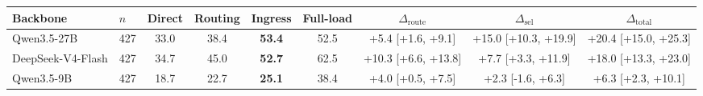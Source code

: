\begin{tabular}{llcccc ccc}
\toprule
Backbone & $n$ & Direct & Routing & Ingress & Full-load & $\Delta_{\text{route}}$ & $\Delta_{\text{sel}}$ & $\Delta_{\text{total}}$ \\
\midrule
Qwen3.5-27B & 427 & 33.0 & 38.4 & \textbf{53.4} & 52.5 & +5.4 [+1.6, +9.1] & +15.0 [+10.3, +19.9] & +20.4 [+15.0, +25.3] \\
DeepSeek-V4-Flash & 427 & 34.7 & 45.0 & \textbf{52.7} & 62.5 & +10.3 [+6.6, +13.8] & +7.7 [+3.3, +11.9] & +18.0 [+13.3, +23.0] \\
Qwen3.5-9B & 427 & 18.7 & 22.7 & \textbf{25.1} & 38.4 & +4.0 [+0.5, +7.5] & +2.3 [-1.6, +6.3] & +6.3 [+2.3, +10.1] \\
\bottomrule
\end{tabular}